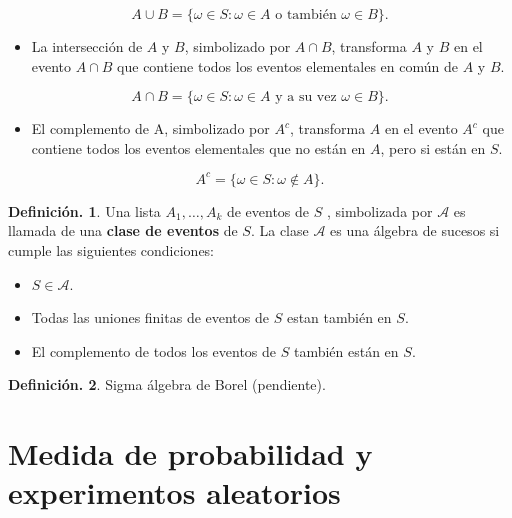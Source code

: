 \documentclass[]{book}
\providecommand{\tightlist}{%
  \setlength{\itemsep}{0pt}\setlength{\parskip}{0pt}}
\theoremstyle{definition}
\newtheorem{definition}{Definición.}[chapter]
\theoremstyle{definition}
\theoremstyle{definition}
\theoremstyle{remark}
\begin{document}
\[A \cup B = \{\omega \in S: \omega \in A \mbox{ o también } \omega \in B
\}. \]

\begin{itemize}
\tightlist
\item
  La intersección de \(A\) y \(B\), simbolizado por \(A \cap B\), transforma \(A\)
  y \(B\) en el evento \(A\cap B\) que contiene todos los eventos elementales
  en común de \(A\) y \(B\).
\end{itemize}

\[A \cap B = \{\omega \in S: \omega \in A \mbox{ y a su vez } \omega \in B
\}. \]

\begin{itemize}
\tightlist
\item
  El complemento de A, simbolizado por \(A^c\), transforma \(A\) en el evento
  \(A^c\) que contiene todos los eventos elementales que no están en \(A\), pero
  si están en \(S\).
\end{itemize}

\[ A^c = \{\omega\in S: \omega \notin A \}. \]

\begin{definition}
\protect\hypertarget{def:unnamed-chunk-89}{}{\label{def:unnamed-chunk-89} }
Una lista \(A_1, \ldots, A_k\) de eventos de \(S\) , simbolizada por
\(\mathcal{A}\) es llamada de una \textbf{clase de eventos} de \(S\).
La clase \(\mathcal{A}\) es una álgebra de sucesos si cumple las siguientes
condiciones:

\begin{itemize}
\item
  \(S \in \mathcal{A}\).
\item
  Todas las uniones finitas de eventos de \(S\) estan también en \(S\).
\item
  El complemento de todos los eventos de \(S\) también están en \(S\).
\end{itemize}
\end{definition}

\begin{definition}
\protect\hypertarget{def:unnamed-chunk-90}{}{\label{def:unnamed-chunk-90} }Sigma álgebra de Borel (pendiente).
\end{definition}

\hypertarget{medida-de-probabilidad-y-experimentos-aleatorios}{%
\section{Medida de probabilidad y experimentos aleatorios}\label{medida-de-probabilidad-y-experimentos-aleatorios}}
\end{document}
